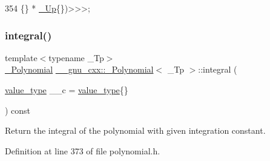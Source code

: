 \begin{DoxyCode}
354                                                             \{\} * \hyperlink{class____gnu__cxx_1_1__Polynomial_a242114d4b86648a5dff67a8221f80d40}{\_Up}\{\})>>>;
\end{DoxyCode}
\mbox{\label{class____gnu__cxx_1_1__Polynomial_a4f9871fb66fc6075767f1db61a323fd0}} 
\subsubsection{\texorpdfstring{integral()}{integral()}}
{\footnotesize\ttfamily template$<$typename \+\_\+\+Tp$>$ \\
\hyperlink{class____gnu__cxx_1_1__Polynomial}{\+\_\+\+Polynomial} \hyperlink{class____gnu__cxx_1_1__Polynomial}{\+\_\+\+\_\+gnu\+\_\+cxx\+::\+\_\+\+Polynomial}$<$ \+\_\+\+Tp $>$\+::integral (\begin{DoxyParamCaption}\item[{\hyperlink{class____gnu__cxx_1_1__Polynomial_a725563351f50e76084a7a016c06f8a53}{value\+\_\+type}}]{\+\_\+\+\_\+c = {\ttfamily \hyperlink{class____gnu__cxx_1_1__Polynomial_a725563351f50e76084a7a016c06f8a53}{value\+\_\+type}\{\}} }\end{DoxyParamCaption}) const\hspace{0.3cm}{\ttfamily [inline]}}

Return the integral of the polynomial with given integration constant. 

Definition at line 373 of file polynomial.\+h.


